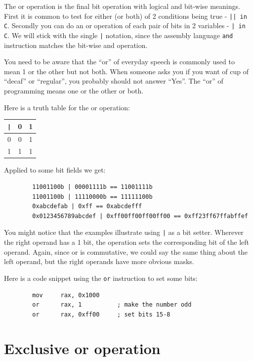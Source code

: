 \documentclass[11pt,b5paper]{book}
\begin{document}
The or operation is the final bit operation with logical and bit-wise 
meanings.
First it is common to test for either (or both) of 2 conditions being true - {\tt || in C}.
Secondly you can do an or operation of each pair of bits in 2 variables -
{\tt | in C}.
We will stick with the single {\tt |} notation, since the assembly language
{\tt and} instruction matches the bit-wise and operation.

You need to be aware that the ``or'' of everyday speech is commonly used to
mean 1 or the other but not both.
When someone asks you if you want of cup of ``decaf'' or ``regular'', you 
probably should not answer ``Yes''.
The ``or'' of programming means one or the other or both.

Here is a truth table for the or operation:

\begin{center}
\begin{tabular}{c|cc}
{\tt |} & 0 & 1 \\
\hline
0       & 0 & 1 \\
1       & 1 & 1 \\
\end{tabular}
\end{center}


Applied to some bit fields we get:

\begin{verbatim}
        11001100b | 00001111b == 11001111b
        11001100b | 11110000b == 11111100b
        0xabcdefab | 0xff == 0xabcdefff
        0x0123456789abcdef | 0xff00ff00ff00ff00 == 0xff23ff67ffabffef
\end{verbatim}

You might notice that the examples illustrate using {\tt |} as a bit 
setter.
Wherever the right operand has a 1 bit, the operation sets the
corresponding bit of the left operand.
Again, since or is commutative, we could say the same thing about the left
operand, but the right operands have more obvious masks.

Here is a code snippet using the {\tt or} instruction to set some bits:
\begin{verbatim}
        mov     rax, 0x1000
        or      rax, 1          ; make the number odd
        or      rax, 0xff00     ; set bits 15-8
\end{verbatim}

\section{Exclusive or operation}
\end{document}
